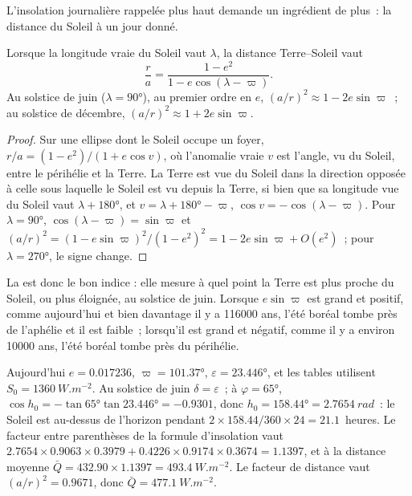 L'insolation journalière rappelée plus haut demande un ingrédient de plus~: la distance du Soleil
à un jour donné.

\begin{proposition}\label{prop:b2:orbital-forcing:distance}
Lorsque la longitude vraie du Soleil vaut $\lambda$, la distance Terre--Soleil vaut
\[
  \frac{r}{a} = \frac{1 - e^2}{1 - e\cos(\lambda - \varpi)} .
\]
Au solstice de juin ($\lambda = \ang{90}$), au premier ordre en $e$,
$(a/r)^2 \approx 1 - 2e\sin\varpi$~; au solstice de décembre, $(a/r)^2 \approx 1 + 2e\sin\varpi$.
\end{proposition}

\begin{proof}
Sur une ellipse dont le Soleil occupe un foyer, $r/a = (1 - e^2)/(1 + e\cos v)$, où l'anomalie vraie $v$
est l'angle, vu du Soleil, entre le périhélie et la Terre. La Terre est vue du Soleil dans la direction
opposée à celle sous laquelle le Soleil est vu depuis la Terre, si bien que sa longitude vue du Soleil vaut
$\lambda + \ang{180}$, et $v = \lambda + \ang{180} - \varpi$, $\cos v = -\cos(\lambda - \varpi)$.
Pour $\lambda = \ang{90}$, $\cos(\lambda - \varpi) = \sin\varpi$ et $(a/r)^2 = (1 -
e\sin\varpi)^2/(1 - e^2)^2 = 1 - 2e\sin\varpi + O(e^2)$~; pour $\lambda = \ang{270}$, le signe change.
\end{proof}

La  est donc le bon indice : elle mesure à quel point la Terre est plus proche
du Soleil, ou plus éloignée, au solstice de juin. Lorsque $e\sin\varpi$ est grand et positif, comme aujourd'hui et
bien davantage il y a \num{116000} ans, l'été boréal tombe près de l'aphélie et il est faible~; lorsqu'il est grand et négatif,
comme il y a environ \num{10000} ans, l'été boréal tombe près du périhélie.

\begin{example}\label{ex:b2:orbital-forcing:today}
Aujourd'hui $e = 0.017236$, $\varpi = \ang{101.37}$, $\varepsilon = \ang{23.446}$, et les tables utilisent
$S_0 = \qty{1360}{W.m^{-2}}$. Au solstice de juin $\delta = \varepsilon$~; à $\varphi =
\ang{65}$, $\cos h_0 = -\tan\ang{65}\tan\ang{23.446} = -0.9301$, donc $h_0 = \ang{158.44} =
\qty{2.7654}{rad}$~: le Soleil est au-dessus de l'horizon pendant $2 \times 158.44/360 \times 24 = 21.1$~heures. Le facteur entre parenthèses de la formule d'insolation vaut
$2.7654 \times 0.9063 \times 0.3979 + 0.4226 \times 0.9174 \times 0.3674 =
1.1397$, et à la distance moyenne $\bar Q = 432.90 \times 1.1397 = \qty{493.4}{W.m^{-2}}$. Le
facteur de distance vaut $(a/r)^2 = 0.9671$, donc $\bar Q = \qty{477.1}{W.m^{-2}}$.
\end{example}

